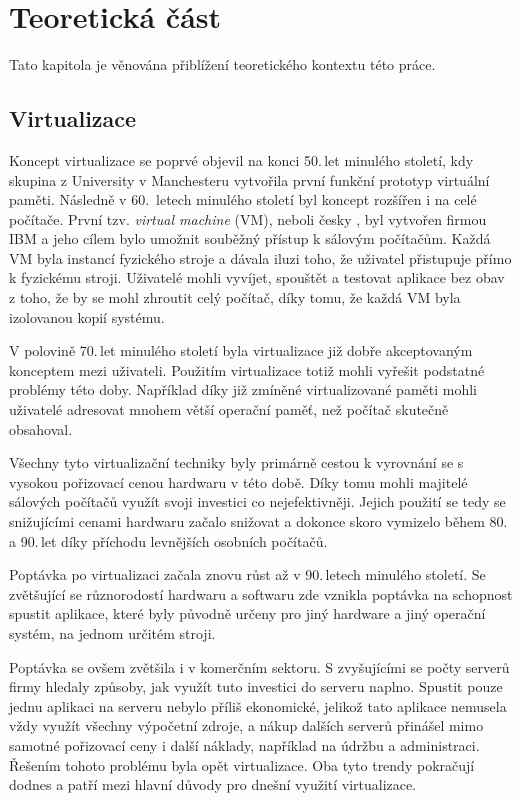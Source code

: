 \chapter{Teoretická část}\label{chap:teorie}

Tato kapitola je věnována přiblížení teoretického kontextu této práce.

\section{Virtualizace}\label{sec:virtualization}

Koncept virtualizace se poprvé objevil na konci 50.\,let minulého století, kdy skupina z University v Manchesteru vytvořila první funkční prototyp virtuální paměti. Následně v 60.\, letech minulého století byl koncept rozšířen i na celé počítače. První tzv. \textit{virtual machine} (VM), neboli česky , byl vytvořen firmou IBM a jeho cílem bylo umožnit souběžný přístup k sálovým počítačům. Každá VM byla instancí fyzického stroje a dávala iluzi toho, že uživatel přistupuje přímo k fyzickému stroji. Uživatelé mohli vyvíjet, spouštět a testovat aplikace bez obav z toho, že by se mohl zhroutit celý počítač, díky tomu, že každá VM byla izolovanou kopií systému.\,\cite{campbell2006introduction}

V polovině 70.\,let minulého století byla virtualizace již dobře akceptovaným konceptem mezi uživateli. Použitím virtualizace totiž mohli vyřešit podstatné problémy této doby. Například díky již zmíněné virtualizované paměti mohli uživatelé adresovat mnohem větší operační paměť, než počítač skutečně obsahoval.\,\cite{campbell2006introduction}

Všechny tyto virtualizační techniky byly primárně cestou k vyrovnání se s vysokou pořizovací cenou hardwaru v této době. Díky tomu mohli majitelé sálových počítačů využít svoji investici co nejefektivněji. Jejich použití se tedy se snižujícími cenami hardwaru začalo snižovat a dokonce skoro vymizelo během 80. a 90.\,let díky příchodu levnějších osobních počítačů.\,\cite{campbell2006introduction}\cite{chiueh2005survey}

Poptávka po virtualizaci začala znovu růst až v 90.\,letech minulého století. Se zvětšující se různorodostí hardwaru a softwaru zde vznikla poptávka na schopnost spustit aplikace, které byly původně určeny pro jiný hardware a jiný operační systém, na jednom určitém stroji.\,\cite{chiueh2005survey}

Poptávka se ovšem zvětšila i v komerčním sektoru. S zvyšujícími se počty serverů firmy hledaly způsoby, jak využít tuto investici do serveru naplno. Spustit pouze jednu aplikaci na serveru nebylo příliš ekonomické, jelikož tato aplikace nemusela vždy využít všechny výpočetní zdroje, a nákup dalších serverů přinášel mimo samotné pořizovací ceny i další náklady, například na údržbu a administraci. Řešením tohoto problému byla opět virtualizace. Oba tyto trendy pokračují dodnes a patří mezi hlavní důvody pro dnešní využití virtualizace.\,\cite{campbell2006introduction}\cite{chiueh2005survey}

